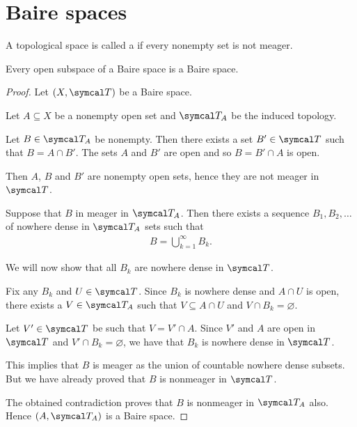 \section{Baire spaces}\label{sec:baire_spaces}

\begin{definition}\label{def:baire_space}
  A topological space is called a  if every nonempty set is not meager.
\end{definition}

\begin{proposition}\label{thm:open_subspace_of_baire_space_is_baire}
  Every open subspace of a Baire space is a Baire space.
\end{proposition}
\begin{proof}
  Let \( (X, \Cal{T}) \) be a Baire space.

  Let \( A \subseteq X \) be a nonempty open set and \( \Cal{T}_A \) be the induced topology.

  Let \( B \in \Cal{T}_A \) be nonempty. Then there exists a set \( B' \in \Cal{T} \) such that \( B = A \cap B' \). The sets \( A \) and \( B' \) are open and so \( B = B' \cap A \) is open.

  Then \( A \), \( B \) and \( B' \) are nonempty open sets, hence they are not meager in \( \Cal{T} \).

  Suppose that \( B \) in meager in \( \Cal{T}_A \). Then there exists a sequence \( B_1, B_2, \ldots \) of nowhere dense in \( \Cal{T}_A \) sets such that
  \begin{align*}
    B = \bigcup_{k=1}^\infty B_k.
  \end{align*}

  We will now show that all \( B_k \) are nowhere dense in \( \Cal{T} \).

  Fix any \( B_k \) and \( U \in \Cal{T} \). Since \( B_k \) is nowhere dense and \( A \cap U \) is open, there exists a \( V \in \Cal{T}_A \) such that \( V \subseteq A \cap U \) and \( V \cap B_k = \varnothing \).

  Let \( V' \in \Cal{T} \) be such that \( V = V' \cap A \). Since \( V' \) and \( A \) are open in \( \Cal{T} \) and \( V' \cap B_k = \varnothing \), we have that \( B_k \) is nowhere dense in \( \Cal{T} \).

  This implies that \( B \) is meager as the union of countable nowhere dense subsets. But we have already proved that \( B \) is nonmeager in \( \Cal{T} \).

  The obtained contradiction proves that \( B \) is nonmeager in \( \Cal{T}_A \) also. Hence \( (A, \Cal{T}_A) \) is a Baire space.
\end{proof}
